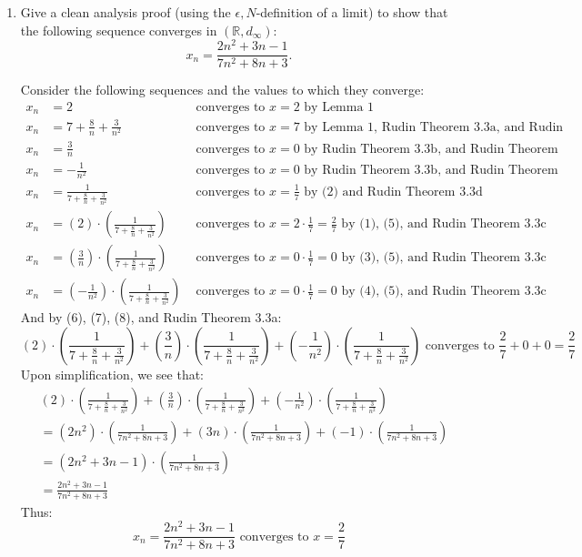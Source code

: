 \documentclass{amsart}
\begin{document}
\begin{enumerate}[1.]
\item Give a clean analysis proof (using the $\epsilon,N$-definition of a limit) to show that the following sequence converges in $(\mathbb{R},d_{\infty})$:
\[ x_n = \frac{2n^2+3n-1}{7n^2+8n+3}. \]

Consider the following sequences and the values to which they converge:
\begin{align}
    x_n &= 2 &\text{ converges to } x = 2 \text{ by Lemma 1}\\
    x_n &= 7 + \frac{8}{n} + \frac{3}{n^2} &\text{ converges to } x = 7 \text{ by Lemma 1, Rudin Theorem 3.3a, and Rudin Theorem 3.20a} \\
    x_n &= \frac{3}{n} &\text{ converges to } x = 0 \text{ by Rudin Theorem 3.3b, and Rudin Theorem 3.20a}\\
    x_n &= -\frac{1}{n^2} &\text{ converges to } x = 0 \text{ by Rudin Theorem 3.3b, and Rudin Theorem 3.20a} \\
    x_n &= \frac{1}{7 + \frac{8}{n} + \frac{3}{n^2}} &\text{ converges to } x = \frac{1}{7} \text{ by (2) and Rudin Theorem 3.3d} \\
    x_n &= (2)\cdot \left(\frac{1}{7 + \frac{8}{n} + \frac{3}{n^2}}\right) &\text{ converges to } x = 2\cdot\frac{1}{7} = \frac{2}{7} \text{ by (1), (5), and Rudin Theorem 3.3c} \\
    x_n &= \left(\frac{3}{n}\right)\cdot\left(\frac{1}{7 + \frac{8}{n} + \frac{3}{n^2}} \right) &\text{ converges to } x = 0 \cdot \frac{1}{7} = 0 \text{ by (3), (5), and Rudin Theorem 3.3c} \\
    x_n &= \left(-\frac{1}{n^2}\right)\cdot\left(\frac{1}{7 + \frac{8}{n} + \frac{3}{n^2}} \right) &\text{ converges to } x = 0 \cdot \frac{1}{7} = 0 \text{ by (4), (5), and Rudin Theorem 3.3c}
\end{align}
And by (6), (7), (8), and Rudin Theorem 3.3a:
\[
    (2)\cdot \left(\frac{1}{7 + \frac{8}{n} + \frac{3}{n^2}}\right) +
    \left(\frac{3}{n}\right)\cdot\left(\frac{1}{7 + \frac{8}{n} + \frac{3}{n^2}} \right) +
    \left(-\frac{1}{n^2}\right)\cdot\left(\frac{1}{7 + \frac{8}{n} + \frac{3}{n^2}} \right)
    \text{ converges to } \frac{2}{7} + 0 + 0 = \frac{2}{7}
\]
Upon simplification, we see that:
\begin{align*}
    &(2)\cdot \left(\frac{1}{7 + \frac{8}{n} + \frac{3}{n^2}}\right) +
    \left(\frac{3}{n}\right)\cdot\left(\frac{1}{7 + \frac{8}{n} + \frac{3}{n^2}} \right) +
    \left(-\frac{1}{n^2}\right)\cdot\left(\frac{1}{7 + \frac{8}{n} + \frac{3}{n^2}} \right) \\
    &= (2n^2)\cdot \left(\frac{1}{7n^2 + 8n + 3}\right) +
    \left(3n\right)\cdot\left(\frac{1}{7n^2 + 8n + 3} \right) +
    \left(-1\right)\cdot\left(\frac{1}{7n^2 + 8n + 3} \right) \\
    &= (2n^2 + 3n - 1)\cdot \left(\frac{1}{7n^2 + 8n + 3} \right) \\
    &= \frac{2n^2 + 3n - 1}{7n^2 + 8n + 3}
\end{align*}
Thus:
\[
    x_n = \frac{2n^2 + 3n - 1}{7n^2 + 8n + 3} \text{ converges to } x = \frac{2}{7}
\]
\newpage


\end{enumerate}
\end{document}
